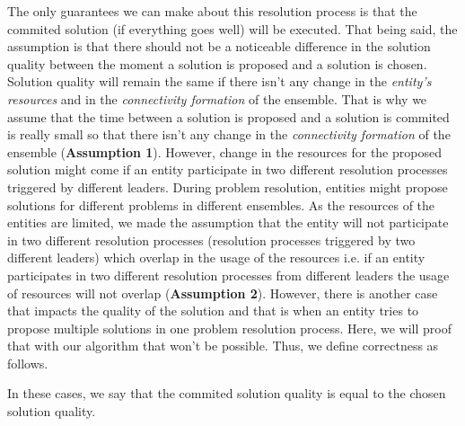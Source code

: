 \documentclass[journal]{IEEEtran}
\theoremstyle{definition}
\begin{document}
The only guarantees we can make about this resolution process is that the commited solution (if everything goes well) will be executed. That being said, the assumption is that there should not be a noticeable difference in the solution quality between the moment a solution is proposed and a solution is chosen. Solution quality will remain the same if there isn't any change in the \textit{entity's resources} and in the \textit{connectivity formation} of the ensemble.
That is why we assume that the time between a solution is proposed and a solution is commited is really small so that there isn't any change in the \textit{connectivity formation} of the ensemble (\textbf{Assumption 1}).
However, change in the resources for the proposed solution might come if an entity participate in two different resolution processes triggered by different leaders. During problem resolution, entities might propose solutions for different problems in different ensembles. As the resources of the entities are limited, we made the assumption that
the entity will not participate in two different resolution processes (resolution processes triggered by two different leaders) which overlap in the usage of the resources i.e. 
if an entity participates in two different resolution processes from different leaders the usage of resources will not overlap (\textbf{Assumption 2}). 
However, there is another case that impacts the quality of the solution and that is when an entity tries to propose multiple solutions in one problem resolution process. Here, we will proof that with our algorithm that won't be possible. 
Thus, we define correctness as follows.

In these cases, we say that the commited solution quality is equal to the chosen solution quality. 



\end{document}
